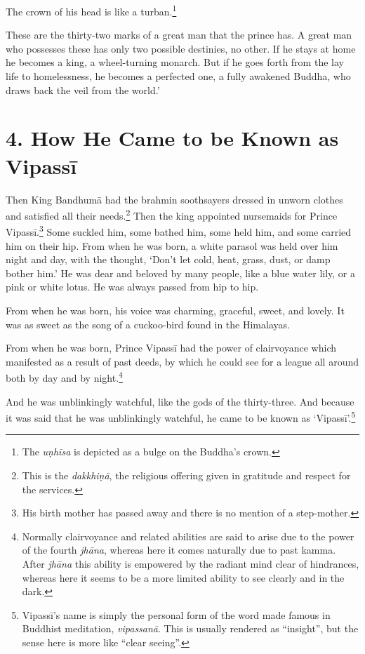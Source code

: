 \documentclass[12pt,openany]{book}%
\begin{document}
The crown of his head is like a turban.\footnote{The \textit{\textsanskrit{uṇhīsa}} is depicted as a bulge on the Buddha’s crown. } 

These are the thirty-two marks of a great man that the prince has. A great man who possesses these has only two possible destinies, no other. If he stays at home he becomes a king, a wheel-turning monarch. But if he goes forth from the lay life to homelessness, he becomes a perfected one, a fully awakened Buddha, who draws back the veil from the world.’ 

\section*{4. How He Came to be Known as \textsanskrit{Vipassī} }

Then King \textsanskrit{Bandhumā} had the brahmin soothsayers dressed in unworn clothes and satisfied all their needs.\footnote{This is the \textit{\textsanskrit{dakkhiṇā}}, the religious offering given in gratitude and respect for the services. } Then the king appointed nursemaids for Prince \textsanskrit{Vipassī}.\footnote{His birth mother has passed away and there is no mention of a step-mother. } Some suckled him, some bathed him, some held him, and some carried him on their hip. From when he was born, a white parasol was held over him night and day, with the thought, ‘Don’t let cold, heat, grass, dust, or damp bother him.’ He was dear and beloved by many people, like a blue water lily, or a pink or white lotus. He was always passed from hip to hip. 

From when he was born, his voice was charming, graceful, sweet, and lovely. It was as sweet as the song of a cuckoo-bird found in the Himalayas. 

From when he was born, Prince \textsanskrit{Vipassī} had the power of clairvoyance which manifested as a result of past deeds, by which he could see for a league all around both by day and by night.\footnote{Normally clairvoyance and related abilities are said to arise due to the power of the fourth \textit{\textsanskrit{jhāna}}, whereas here it comes naturally due to past kamma. After \textit{\textsanskrit{jhāna}} this ability is empowered by the radiant mind clear of hindrances, whereas here it seems to be a more limited ability to see clearly and in the dark. } 

And he was unblinkingly watchful, like the gods of the thirty-three. And because it was said that he was unblinkingly watchful, he came to be known as ‘\textsanskrit{Vipassī}’.\footnote{\textsanskrit{Vipassī}’s name is simply the personal form of the word made famous in Buddhist meditation, \textit{\textsanskrit{vipassanā}}. This is usually rendered as “insight”, but the sense here is more like “clear seeing”. } 
\end{document}
